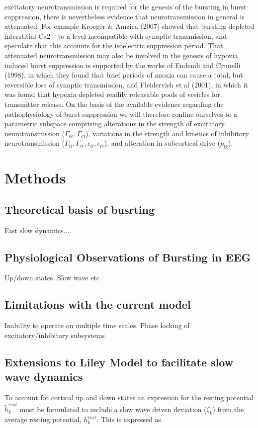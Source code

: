 \documentclass[a4paper,12pt]{article}
\begin{document}
excitatory neurotransmission is required for the genesis of the bursting
in burst suppression, there is nevertheless evidence that
neurotransmission in general is attenuated. For example Kroeger \&
Amzica (2007) showed that bursting depleted interstitial Ca2+ to a
level incompatible with synaptic transmission, and speculate that this
accounts for the isoelectric suppression period. That attenuated
neurotransmission may also be involved in the genesis of hypoxia
induced burst suppression is supported by the works of Endemli and
Crunelli (1998), in which they found that brief periods of anoxia can
cause a total, but reversible loss of synaptic transmission, and
Fleidervish et al (2001), in which it was found that hypoxia depleted
readily releasable pools of vesicles for transmitter release.
On the basis of the available evidence regarding the pathophysiology
of burst suppression we will therefore confine ourselves to a
parametric subspace comprising alterations in the strength of excitatory neurotransmission 
($\Gamma_{ee},  \Gamma_{ei}$), variations in the strength and kinetics of inhibitory neurotransmission ($\Gamma_{ii},  \Gamma_{ie}, \epsilon_{ii}, \epsilon_{ie}$),
and alteration in subcortical drive ($p_{lk}$).

\section{Methods}
\subsection{Theoretical basis of busrting}
Fast slow dynamics....

\subsection{Physiological Observations of Bursting in EEG}
Up/down states. Slow wave etc

\subsection{Limitations with the current model}
Inability to operate on multiple time scales. Phase locking of excitatory/inhibitory subsystems


\subsection{Extensions to Liley Model to facilitate slow wave dynamics}
To account for cortical up and down states an expression for the resting potential $\tilde{h}_k^{rest}$ must be formulated to include a slow wave driven
deviation ($\zeta_{k}$) from the average resting potential, $h_k^{rest}$. This is expressed as
\end{document}
